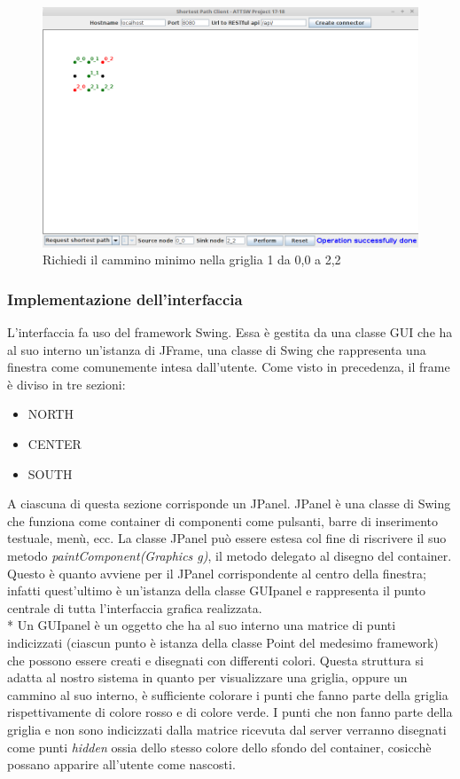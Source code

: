 \begin{figure}
	\centering
	\includegraphics[width=0.7\linewidth]{Chapters/4}
	\caption[Interfaccia utente]{Richiedi il cammino minimo nella griglia 1 da 0,0 a 2,2}
	\label{fig:4}
\end{figure}

 \subsubsection{Implementazione dell'interfaccia}
 L'interfaccia fa uso del framework Swing. Essa \`e gestita da una classe GUI che ha al suo interno un'istanza di JFrame, una classe di Swing che rappresenta una finestra come comunemente intesa dall'utente. Come visto in precedenza, il frame \`e diviso in tre sezioni:
 \begin{itemize}
 	\item NORTH
 	\item CENTER
 	\item SOUTH
 \end{itemize}
A ciascuna di questa sezione corrisponde un JPanel. JPanel \`e una classe di Swing che funziona come container di componenti come pulsanti, barre di inserimento testuale, men\`u, ecc. La classe JPanel pu\`o essere estesa col fine di riscrivere il suo metodo \emph{paintComponent(Graphics g)}, il metodo delegato al disegno del container. Questo \`e quanto avviene per il JPanel corrispondente al centro della finestra; infatti quest'ultimo \`e un'istanza della classe GUIpanel e rappresenta il punto centrale di tutta l'interfaccia grafica realizzata.\\*
Un GUIpanel \`e un oggetto che ha al suo interno una matrice di punti indicizzati (ciascun punto \`e istanza della classe Point del medesimo framework) che possono essere creati e disegnati con differenti colori. Questa struttura si adatta al nostro sistema in quanto per visualizzare una griglia, oppure un cammino al suo interno, \`e sufficiente colorare i punti che fanno parte della griglia rispettivamente di colore rosso e di colore verde. I punti che non fanno parte della griglia e non sono indicizzati dalla matrice ricevuta dal server verranno disegnati come punti \emph{hidden} ossia dello stesso colore dello sfondo del container, cosicch\`e possano apparire all'utente come nascosti.